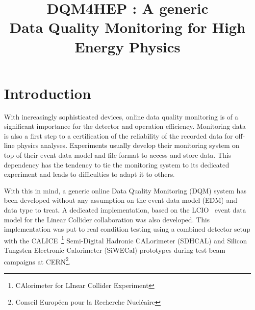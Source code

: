 \documentclass[conference]{IEEEtran}
\begin{document}
\title{DQM4HEP : A generic\\Data Quality Monitoring for High Energy Physics}

\author{


\and


\and


}

\maketitle

\IEEEpeerreviewmaketitle

\section{Introduction}

With increasingly sophisticated devices, online data quality monitoring is of a significant importance for the detector and operation efficiency. Monitoring data is also a first step to a certification of the reliability of the recorded data for off-line physics analyses. Experiments usually develop their monitoring system on top of their event data model and file format to access and store data. This dependency has the tendency to tie the monitoring system to its dedicated experiment and leads to difficulties to adapt it to others.

With this in mind, a generic online Data Quality Monitoring (DQM) system has been developed without any assumption on the event data model (EDM) and data type to treat. A dedicated implementation, based on the LCIO~\cite{LCIO} event data model for the Linear Collider collaboration was also developed. This implementation was put to real condition testing using a combined detector setup with the CALICE~\footnote{CAlorimeter for LInear Collider Experiment} Semi-Digital Hadronic CALorimeter (SDHCAL) and Silicon Tungsten Electronic Calorimeter (SiWECal) prototypes during test beam campaigns at CERN\footnote{Conseil Européen pour la Recherche Nucléaire}.
\end{document}
